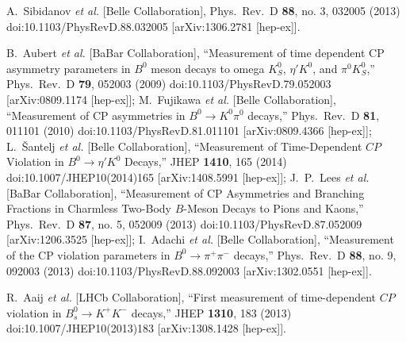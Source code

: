 \documentclass[aps,preprint,floats,epsf,epsfig,nofootinbib,letter]{revtex4}
\begin{document}
\begin{thebibliography}{99}
  A.~Sibidanov {\it et al.} [Belle Collaboration],
  Phys.\ Rev.\ D {\bf 88}, no. 3, 032005 (2013)
  doi:10.1103/PhysRevD.88.032005
  [arXiv:1306.2781 [hep-ex]].

  
 

  B.~Aubert {\it et al.} [BaBar Collaboration],
  ``Measurement of time dependent CP asymmetry parameters in $B^0$ meson decays to omega $K^0_S$, $\eta' K^0$, and $\pi^0 K^0_S$,''
  Phys.\ Rev.\ D {\bf 79}, 052003 (2009)
  doi:10.1103/PhysRevD.79.052003
  [arXiv:0809.1174 [hep-ex]];
  M.~Fujikawa {\it et al.} [Belle Collaboration],
  ``Measurement of CP asymmetries in $B^0 \to K^0 \pi^0$ decays,''
  Phys.\ Rev.\ D {\bf 81}, 011101 (2010)
  doi:10.1103/PhysRevD.81.011101
  [arXiv:0809.4366 [hep-ex]];
  L.~Šantelj {\it et al.} [Belle Collaboration],
  ``Measurement of Time-Dependent $CP$ Violation in $B^0\to \eta'K^0$ Decays,''
  JHEP {\bf 1410}, 165 (2014)
  doi:10.1007/JHEP10(2014)165
  [arXiv:1408.5991 [hep-ex]];
  J.~P.~Lees {\it et al.} [BaBar Collaboration],
  ``Measurement of CP Asymmetries and Branching Fractions in Charmless Two-Body $B$-Meson Decays to Pions and Kaons,''
  Phys.\ Rev.\ D {\bf 87}, no. 5, 052009 (2013)
  doi:10.1103/PhysRevD.87.052009
  [arXiv:1206.3525 [hep-ex]];
  I.~Adachi {\it et al.} [Belle Collaboration],
  ``Measurement of the CP violation parameters in $B^0 \to \pi^+ \pi^-$ decays,''
  Phys.\ Rev.\ D {\bf 88}, no. 9, 092003 (2013)
  doi:10.1103/PhysRevD.88.092003
  [arXiv:1302.0551 [hep-ex]].
  

  R.~Aaij {\it et al.} [LHCb Collaboration],
  ``First measurement of time-dependent $C\!P$ violation in $B^0_s \to K^+K^-$ decays,''
  JHEP {\bf 1310}, 183 (2013)
  doi:10.1007/JHEP10(2013)183
  [arXiv:1308.1428 [hep-ex]].


\end{thebibliography}
\end{document}
